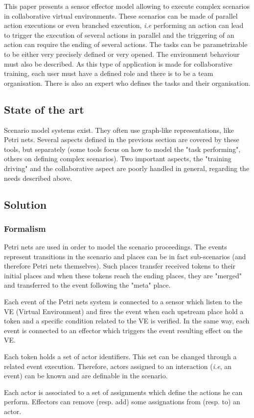 \documentclass[a4paper]{article}
\begin{document}
This paper presents a sensor effector model allowing to execute complex scenarios in collaborative virtual environments. These scenarios can be made of parallel action executions or even branched execution, \textit{i.e} performing an action can lead to trigger the execution of several actions in parallel and the triggering of an action can require the ending of several actions. The tasks can be parametrizable to be either very precisely defined or very opened. The environment behaviour must also be described. As this type of application is made for collaborative training, each user must have a defined role and there is to be a team organisation. There is also an expert who defines the tasks and their organisation.

\subsection{State of the art}

Scenario model systems exist. They often use graph-like representations, like Petri nets. Several aspects defined in the previous section are covered by these tools, but separately (some tools focus on how to model the "task performing", others on defining complex scenarios). Two important aspects, the "training driving" and the collaborative aspect are poorly handled in general, regarding the needs described above.

\subsection{Solution}

\subsubsection{Formalism}
Petri nets are used in order to model the scenario proceedings. The events represent transitions in the scenario and places can be in fact sub-scenarios (and therefore Petri nets themselves). Such places transfer received tokens to their initial places and when these tokens reach the ending places, they are "merged" and transferred to the event following the "meta" place.

Each event of the Petri nets system  is connected to a sensor which listen to the VE (Virtual Environment) and fires the event when each upstream place hold a token and a specific condition related to the VE is verified. In the same way, each event is connected to an effector which triggers the event resulting effect on the VE.

Each token holds a set of actor identifiers. This set can be changed through a related event execution. Therefore, actors assigned to an interaction (\textit{i.e}, an event) can be known and are definable in the scenario.

Each actor is associated to a set of assignments which define the actions he can perform. Effectors can remove (resp. add) some assignations from (resp. to) an actor. 
\end{document}
